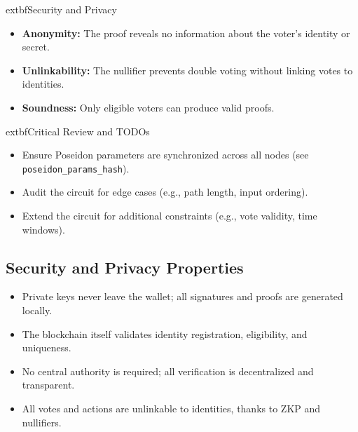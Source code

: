 \documentclass[12pt,a4paper]{report}
\begin{document}
\begin{center}
\end{center}

	extbf{Security and Privacy}
\begin{itemize}
  \item \textbf{Anonymity:} The proof reveals no information about the voter's identity or secret.
  \item \textbf{Unlinkability:} The nullifier prevents double voting without linking votes to identities.
  \item \textbf{Soundness:} Only eligible voters can produce valid proofs.
\end{itemize}

	extbf{Critical Review and TODOs}
\begin{itemize}
  \item Ensure Poseidon parameters are synchronized across all nodes (see \texttt{poseidon\_params\_hash}).
  \item Audit the circuit for edge cases (e.g., path length, input ordering).
  \item Extend the circuit for additional constraints (e.g., vote validity, time windows).
\end{itemize}

\subsection{Security and Privacy Properties}
\begin{itemize}
  \item Private keys never leave the wallet; all signatures and proofs are generated locally.
  \item The blockchain itself validates identity registration, eligibility, and uniqueness.
  \item No central authority is required; all verification is decentralized and transparent.
  \item All votes and actions are unlinkable to identities, thanks to ZKP and nullifiers.
\end{itemize}
\end{document}
